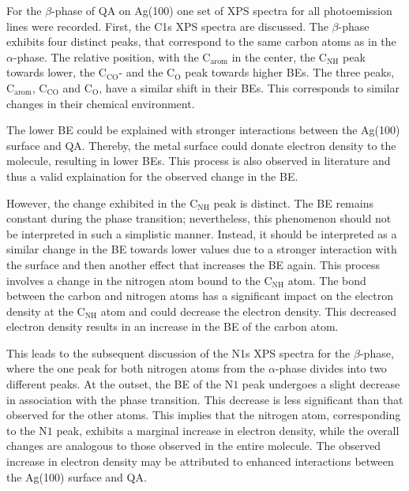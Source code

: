 For the $\beta$-phase of \ac{QA} on Ag(100) one set of \ac{XPS} spectra for all photoemission lines were recorded. First, the C1s \ac{XPS} spectra are discussed.
The $\beta$-phase exhibits four distinct peaks, that correspond to the same carbon atoms as in the $\alpha$-phase. The relative position, with the $\mathrm{C_{arom}}$ in the center, the $\mathrm{C_{NH}}$ peak towards lower, the $\mathrm{C_{CO}}$- and the $\mathrm{C_{O}}$ peak towards higher \acp{BE}. The three peaks, $\mathrm{C_{arom}}$, $\mathrm{C_{CO}}$ and $\mathrm{C_{O}}$, have a similar shift in their \acp{BE}. This corresponds to similar changes in their chemical environment.

The lower \ac{BE} could be explained with stronger interactions between the Ag(100) surface and \ac{QA}. Thereby, the metal surface could donate electron density to the molecule, resulting in lower \acp{BE}. This process is also observed in literature and thus a valid explaination for the observed change in the \ac{BE}.\autocite{Moulder1993}

However, the change exhibited in the $\mathrm{C_{NH}}$ peak is distinct. The \ac{BE} remains constant during the phase transition; nevertheless, this phenomenon should not be interpreted in such a simplistic manner. Instead, it should be interpreted as a similar change in the \ac{BE} towards lower values due to a stronger interaction with the surface and then another effect that increases the \ac{BE} again. This process involves a change in the nitrogen atom bound to the $\mathrm{C_{NH}}$ atom. The bond between the carbon and nitrogen atoms has a significant impact on the electron density at the $\mathrm{C_{NH}}$ atom and could decrease the electron density. This decreased electron density results in an increase in the \ac{BE} of the carbon atom.

This leads to the subsequent discussion of the N1s \ac{XPS} spectra for the $\beta$-phase, where the one peak for both nitrogen atoms from the $\alpha$-phase divides into two different peaks. At the outset, the \ac{BE} of the $\mathrm{N1}$ peak undergoes a slight decrease in association with the phase transition. This decrease is less significant than that observed for the other atoms. This implies that the nitrogen atom, corresponding to the $\mathrm{N1}$ peak, exhibits a marginal increase in electron density, while the overall changes are analogous to those observed in the entire molecule. The observed increase in electron density may be attributed to enhanced interactions between the Ag(100) surface and \ac{QA}.

